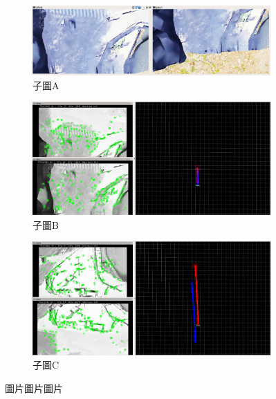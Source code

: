 \begin{figure}[!htbp]
  \centering
  \begin{subfigure}{1.0\textwidth}
    \centering
    \includegraphics[width=\linewidth]{images/sim25_2.png}
    \caption{子圖A}
  \end{subfigure}
  \vspace{1em}
  
  \begin{subfigure}{1.0\textwidth}
    \centering
    \includegraphics[width=\linewidth]{images/sim25_3.png}
    \caption{子圖B}
  \end{subfigure}
  \vspace{1em}
  
  \begin{subfigure}{1.0\textwidth}
    \centering
    \includegraphics[width=\linewidth]{images/sim25_4.png}
    \caption{子圖C}
  \end{subfigure}
  \caption{圖片圖片圖片}
  \label{i:sim25_slam}
\end{figure}
